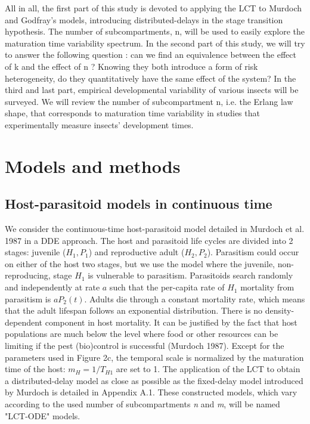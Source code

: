 \documentclass[12pt,a4paper,onecolumn]{article}
\begin{document}
\tabto{1 cm} All in all, the first part of this study is devoted to applying the LCT to Murdoch and Godfray's models, introducing distributed-delays in the stage transition hypothesis. The number of subcompartments, n, will be used to easily explore the maturation time variability spectrum. In the second part of this study, we will try to answer the following question : can we find an equivalence between the effect of k and the effect of n ? Knowing they both introduce a form of risk heterogeneity, do they quantitatively have the same effect of the system?  In the third and last part, empirical developmental variability of various insects will be surveyed. We will review the number of subcompartment n, i.e. the Erlang law shape, that corresponds to maturation time variability in studies that experimentally measure insects' development times. 

\section{Models and methods}

\subsection{Host-parasitoid models in continuous time}
\tabto{1 cm} We consider the continuous-time host-parasitoid model detailed in Murdoch et al. 1987 in a DDE approach. The host and parasitoid life cycles are divided into 2 stages: juvenile ($H_1, P_1$) and reproductive adult ($H_2, P_2$). Parasitism could occur on either of the host two stages, but we use the model where the juvenile, non-reproducing, stage $H_1$ is vulnerable to parasitism. Parasitoids search randomly and independently at rate $a$ such that the per-capita rate of $H_1$ mortality from parasitism is $aP_2(t)$. Adults die through a constant mortality rate, which means that the adult lifespan follows an exponential distribution. There is no density-dependent component in host mortality. It can be justified by the fact that host populations are much below the level where food or other resources can be limiting if the pest (bio)control is successful (Murdoch 1987). Except for the parameters used in Figure 2c, the temporal scale is normalized by the maturation time of the host: $m_H = 1/T_{H1}$ are set to 1. The application of the LCT to obtain a distributed-delay model as close as possible as the fixed-delay model introduced by Murdoch is detailed in Appendix A.1. These constructed models, which vary according to the used number of subcompartments \textit{n} and \textit{m}, will be named "LCT-ODE" models.
\end{document}
